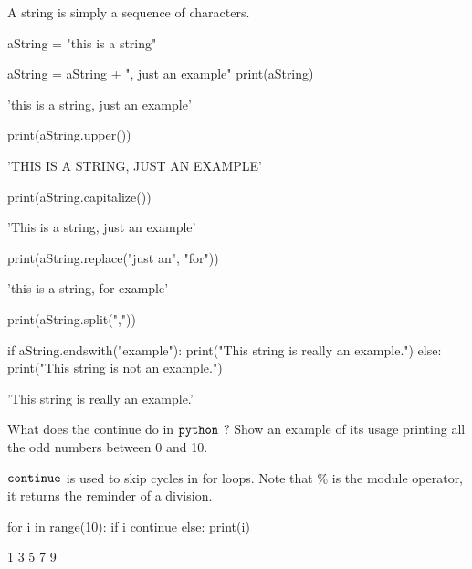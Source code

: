 \cprotEnv \begin{solution}
A string is simply a sequence of characters.

\begin{ipython}
aString = "this is a string"
  
aString = aString + ", just an example"
print(aString)
\end{ipython}
\begin{ioutput}
'this is a string, just an example'
\end{ioutput}
\begin{ipython}
print(aString.upper())
\end{ipython}
\begin{ioutput}
'THIS IS A STRING, JUST AN EXAMPLE'
\end{ioutput}
\begin{ipython}
print(aString.capitalize())
\end{ipython}
\begin{ioutput}
'This is a string, just an example'
\end{ioutput}
\begin{ipython}
print(aString.replace("just an", "for"))
\end{ipython}
\begin{ioutput}
'this is a string, for example'
\end{ioutput}
\begin{ipython}
print(aString.split(","))
\end{ipython}
\begin{ioutput}
\end{ioutput}
\begin{ipython}
if aString.endswith("example"):
    print("This string is really an example.")
else:
    print("This string is not an example.")
\end{ipython}
\begin{ioutput}
'This string is really an example.'
\end{ioutput}
\end{solution}

\begin{question}
What does the continue do in \(\tt{python}\) ? Show an example of its usage printing all the odd numbers between 0 and 10.
\end{question}

\cprotEnv \begin{solution}
\(\tt{continue}\) is used to skip cycles in for loops. Note that \% is the module operator, it returns the reminder of a division.

\begin{ipython}
for i in range(10):
    if i%
        continue
    else:
        print(i)
\end{ipython}
\begin{ioutput}    
1
3
5
7
9
\end{ioutput}
\end{solution}

